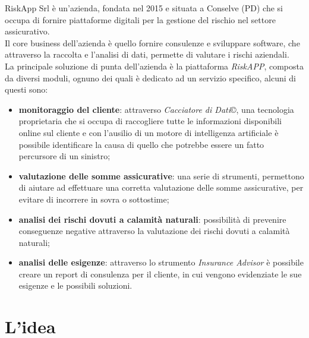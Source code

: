 RiskApp Srl è un'azienda, fondata nel 2015 e situata a Conselve (PD) che si occupa di fornire piattaforme digitali per la gestione del rischio nel settore assicurativo.\\
\indent Il core business dell'azienda è quello fornire consulenze e sviluppare software, che attraverso la raccolta e l'analisi di dati, permette di valutare i rischi aziendali. \\
\indent La principale soluzione di punta dell'azienda è la piattaforma \emph{RiskAPP}, composta da diversi moduli, ognuno dei quali è dedicato ad un servizio specifico, alcuni di questi sono:
\begin{itemize}
    \item \textbf{monitoraggio del cliente}: attraverso \emph{Cacciatore di Dati}\copyright, una tecnologia proprietaria che si occupa di raccogliere tutte le informazioni disponibili online sul cliente e con l'ausilio di un motore di intelligenza artificiale è possibile identificare la causa di quello che potrebbe essere un fatto percursore di un sinistro;
    \item \textbf{valutazione delle somme assicurative}: una serie di strumenti, permettono di aiutare ad effettuare una corretta valutazione delle somme assicurative, per evitare di incorrere in sovra o sottostime;
    \item \textbf{analisi dei rischi dovuti a calamità naturali}: possibilità di prevenire conseguenze negative attraverso la valutazione dei rischi dovuti a calamità naturali;
    \item \textbf{analisi delle esigenze}: attraverso lo strumento \emph{Insurance Advisor} è possibile creare un report di consulenza per il cliente, in cui vengono evidenziate le sue esigenze e le possibili soluzioni.
\end{itemize}

\section{L'idea}
\label{sec:idea}

